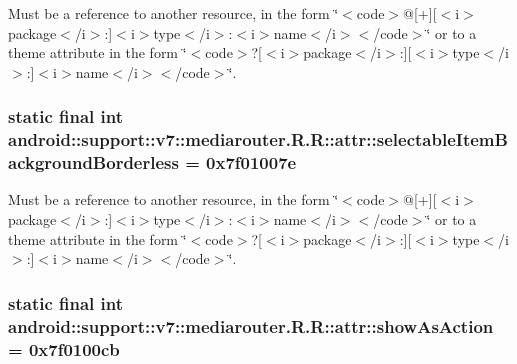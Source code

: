 Must be a reference to another resource, in the form \char`\"{}$<$code$>$@\mbox{[}+\mbox{]}\mbox{[}$<$i$>$package$<$/i$>$:\mbox{]}$<$i$>$type$<$/i$>$:$<$i$>$name$<$/i$>$$<$/code$>$\char`\"{} or to a theme attribute in the form \char`\"{}$<$code$>$?\mbox{[}$<$i$>$package$<$/i$>$:\mbox{]}\mbox{[}$<$i$>$type$<$/i$>$:\mbox{]}$<$i$>$name$<$/i$>$$<$/code$>$\char`\"{}. \hypertarget{classandroid_1_1support_1_1v7_1_1mediarouter_1_1_r_1_1attr_e61b057e76376350ec6852c31a9b1e10}{
\subsubsection[{selectableItemBackgroundBorderless}]{\setlength{\rightskip}{0pt plus 5cm}static final int android::support::v7::mediarouter.R.R::attr::selectableItemBackgroundBorderless = 0x7f01007e}}
\label{classandroid_1_1support_1_1v7_1_1mediarouter_1_1_r_1_1attr_e61b057e76376350ec6852c31a9b1e10}


Must be a reference to another resource, in the form \char`\"{}$<$code$>$@\mbox{[}+\mbox{]}\mbox{[}$<$i$>$package$<$/i$>$:\mbox{]}$<$i$>$type$<$/i$>$:$<$i$>$name$<$/i$>$$<$/code$>$\char`\"{} or to a theme attribute in the form \char`\"{}$<$code$>$?\mbox{[}$<$i$>$package$<$/i$>$:\mbox{]}\mbox{[}$<$i$>$type$<$/i$>$:\mbox{]}$<$i$>$name$<$/i$>$$<$/code$>$\char`\"{}. \hypertarget{classandroid_1_1support_1_1v7_1_1mediarouter_1_1_r_1_1attr_b6d1cde681e130f2256fdf78b83a95dd}{
\subsubsection[{showAsAction}]{\setlength{\rightskip}{0pt plus 5cm}static final int android::support::v7::mediarouter.R.R::attr::showAsAction = 0x7f0100cb}}
\label{classandroid_1_1support_1_1v7_1_1mediarouter_1_1_r_1_1attr_b6d1cde681e130f2256fdf78b83a95dd}


